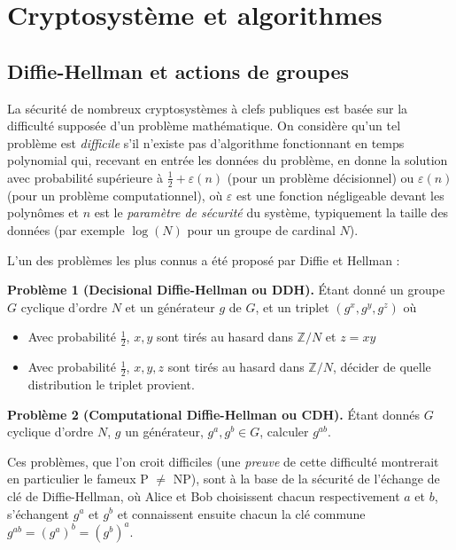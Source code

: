 \documentclass[11pt,a4paper]{article}
\newcommand{\Z}{\mathbb{Z}}
\theoremstyle{definition}
\begin{document}
\newpage

\section{Cryptosystème et algorithmes}



\subsection{Diffie-Hellman et actions de groupes}


La sécurité de nombreux cryptosystèmes à clefs publiques est basée sur la difficulté supposée d'un problème mathématique. On considère qu'un tel problème est \emph{difficile} s'il n'existe pas d'algorithme fonctionnant en temps polynomial qui, recevant en entrée les données du problème, en donne la solution avec probabilité supérieure à $\frac{1}{2}+\varepsilon(n)$ (pour un problème décisionnel) ou $\varepsilon(n)$ (pour un problème computationnel), où $\varepsilon$ est une fonction négligeable devant les polynômes et $n$ est le \emph{paramètre de sécurité} du système, typiquement la taille des données (par exemple $\log(N)$ pour un groupe de cardinal $N$).

L'un des problèmes les plus connus a été proposé par Diffie et Hellman :

\textbf{Problème 1 (Decisional Diffie-Hellman ou DDH).} \'Etant donné un groupe $G$ cyclique d'ordre $N$ et un générateur $g$ de $G$, et un triplet $(g^x,g^y,g^z)$ où
\begin{itemize}
\item Avec probabilité $\frac{1}{2}$, $x,y$ sont tirés au hasard dans $\Z/N$ et $z=xy$
\item Avec probabilité $\frac{1}{2}$, $x,y,z$ sont tirés au hasard dans $\Z/N$,
décider de quelle distribution le triplet provient.
\end{itemize}

\textbf{Problème 2 (Computational Diffie-Hellman ou CDH).} \'Etant donnés $G$ cyclique d'ordre $N$, $g$ un générateur, $g^a,g^b\in G$, calculer $g^{ab}$.

Ces problèmes, que l'on croit difficiles (une \emph{preuve} de cette difficulté montrerait en particulier le fameux P $\neq$ NP), sont à la base de la sécurité de l'échange de clé de Diffie-Hellman, où Alice et Bob choisissent chacun respectivement $a$ et $b$, s'échangent $g^a$ et $g^b$ et connaissent ensuite chacun la clé commune $g^{ab}=(g^a)^b=(g^b)^a$.
\end{document}
